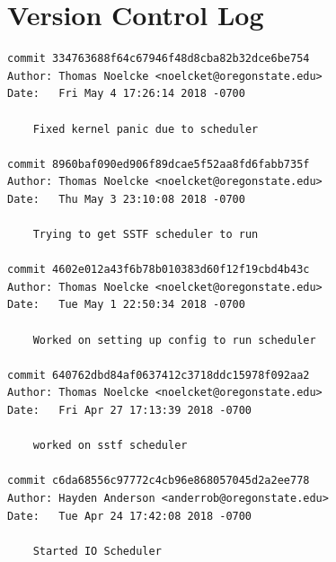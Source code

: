 \documentclass[draftclsnofoot, onecolumn, compsoc, 10pt]{IEEEtran}
\begin{document}
\section{Version Control Log}
    \begin{verbatim}
commit 334763688f64c67946f48d8cba82b32dce6be754
Author: Thomas Noelcke <noelcket@oregonstate.edu>
Date:   Fri May 4 17:26:14 2018 -0700

    Fixed kernel panic due to scheduler

commit 8960baf090ed906f89dcae5f52aa8fd6fabb735f
Author: Thomas Noelcke <noelcket@oregonstate.edu>
Date:   Thu May 3 23:10:08 2018 -0700

    Trying to get SSTF scheduler to run

commit 4602e012a43f6b78b010383d60f12f19cbd4b43c
Author: Thomas Noelcke <noelcket@oregonstate.edu>
Date:   Tue May 1 22:50:34 2018 -0700

    Worked on setting up config to run scheduler

commit 640762dbd84af0637412c3718ddc15978f092aa2
Author: Thomas Noelcke <noelcket@oregonstate.edu>
Date:   Fri Apr 27 17:13:39 2018 -0700

    worked on sstf scheduler

commit c6da68556c97772c4cb96e868057045d2a2ee778
Author: Hayden Anderson <anderrob@oregonstate.edu>
Date:   Tue Apr 24 17:42:08 2018 -0700

    Started IO Scheduler

\end{verbatim}
\end{document}
